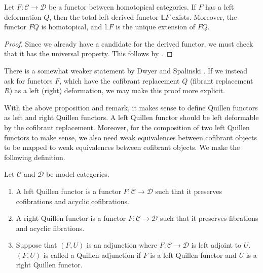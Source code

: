 \documentclass[../thesis.tex]{subfiles}
\begin{document}
            \begin{proposition}
                Let $F:\mathcal{C}\rightarrow\mathcal{D}$ be a functor between homotopical categories. If $F$ has a left deformation $Q$, then the total left derived functor $\mathbb{L}F$ exists. Moreover, the functor $FQ$ is homotopical, and $\mathbb{L}F$ is the unique extension of $FQ$.
            \end{proposition}

            \begin{proof}
                Since we already have a candidate for the derived functor, we must check that it has the universal property. This follows by \cite[Proposition 6.4.11][207]{Riehl16}.
            \end{proof}

            \begin{remark}
                There is a somewhat weaker statement by Dwyer and Spalinski \cite[Proposition 9.3][111]{Dwyer95}. If we instead ask for functors $F$, which have the cofibrant replacement $Q$ (fibrant replacement $R$) as a left (right) deformation, we may make this proof more explicit.
            \end{remark}

            With the above proposition and remark, it makes sense to define Quillen functors as left and right Quillen functors. A left Quillen functor should be left deformable by the cofibrant replacement. Moreover, for the composition of two left Quillen functors to make sense, we also need weak equivalences between cofibrant objects to be mapped to weak equivalences between cofibrant objects. We make the following definition.

            \begin{definition}
                Let $\mathcal{C}$ and $\mathcal{D}$ be model categories. \begin{enumerate}
                    \item A left Quillen functor is a functor $F:\mathcal{C}\rightarrow\mathcal{D}$ such that it preserves cofibrations and acyclic cofibrations.
                    \item A right Quillen functor is a functor $F:\mathcal{C}\rightarrow\mathcal{D}$ such that it preserves fibrations and acyclic fibrations.
                    \item Suppose that $(F,U)$ is an adjunction where $F:\mathcal{C}\rightarrow\mathcal{D}$ is left adjoint to $U$. $(F,U)$ is called a Quillen adjunction if $F$ is a left Quillen functor and $U$ is a right Quillen functor.
                \end{enumerate}
            \end{definition}
\end{document}
